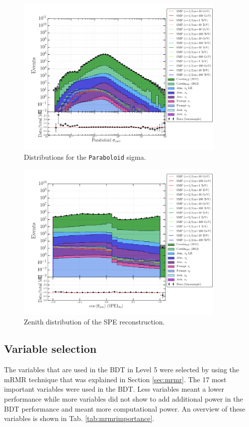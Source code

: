 \begin{figure}
\centering
\includegraphics[width=0.9\textwidth]{chapter8/img/1D_stack_sigma_corr_paraboloid}
\caption{Distributions for the \texttt{Paraboloid} sigma.}
\label{fig:remainingvariablespara}
\end{figure}


\begin{figure}
\centering
\includegraphics[width=0.9\textwidth]{chapter8/img/1D_stack_spefit1_hc_coszenith}
\caption{Zenith distribution of the SPE reconstruction.}
\label{fig:remainingvariableszenith}
\end{figure}




\subsection{Variable selection}
The variables that are used in the BDT in Level 5 were selected by using the mRMR technique that was explained in Section \ref{sec:mrmr}. The 17 most important variables were used in the BDT. Less variables meant a lower performance while more variables did not show to add additional power in the BDT performance and meant more computational power. An overview of these variables is shown in Tab. \ref{tab:mrmrimportance}.

